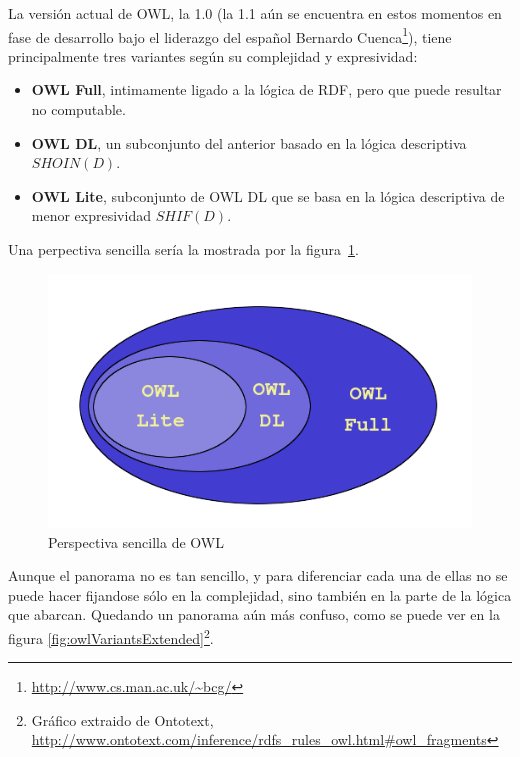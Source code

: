 La versión actual de OWL, la 1.0 (la 1.1 aún se encuentra en estos momentos en 
fase de desarrollo bajo el liderazgo del español Bernardo 
Cuenca\footnote{\url{http://www.cs.man.ac.uk/~bcg/}}), tiene principalmente 
tres variantes según su complejidad y expresividad:

\begin{itemize}
  \item \textbf{OWL Full}, intimamente ligado a la lógica de RDF, pero que puede 
	resultar no computable.
  \item \textbf{OWL DL}, un subconjunto del anterior basado en la lógica 
	descriptiva ${SHOIN} (D)$.
  \item \textbf{OWL Lite}, subconjunto de OWL DL que se basa en la lógica 
	descriptiva de menor expresividad ${SHIF} (D)$.
\end{itemize}

Una perpectiva sencilla sería la mostrada por la figura~\ref{fig:owlVariants}.

\begin{figure}[H]
	\centering
	\includegraphics[width=12cm]{images/owl-variants.png}
	\caption{Perspectiva sencilla de OWL}
	\label{fig:owlVariants}
\end{figure}

Aunque el panorama no es tan sencillo, y para diferenciar cada una de ellas no
se puede hacer fijandose sólo en la complejidad, sino también en la parte de la 
lógica que abarcan. Quedando un panorama aún más confuso, como se puede ver en 
la figura \ref{fig:owlVariantsExtended}\footnote{Gráfico extraido de Ontotext, 
\url{http://www.ontotext.com/inference/rdfs_rules_owl.html#owl_fragments}}.

